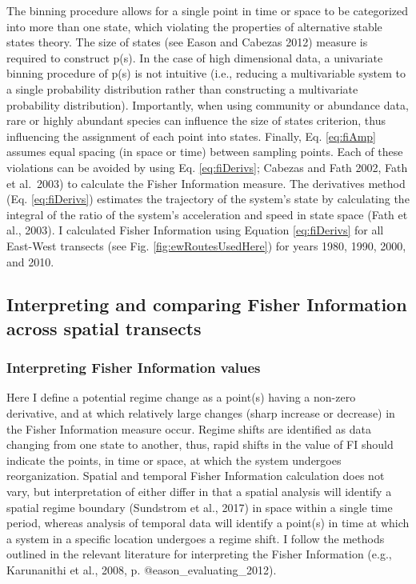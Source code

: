 \documentclass[12pt,twoside,openany]{reedthesis}
\begin{document}
The binning procedure allows for a single point in time or space to be categorized into more than one state, which violating the properties of alternative stable states theory. The size of states (see Eason and Cabezas 2012) measure is required to construct p(s). In the case of high dimensional data, a univariate binning procedure of p(s) is not intuitive (i.e., reducing a multivariable system to a single probability distribution rather than constructing a multivariate probability distribution). Importantly, when using community or abundance data, rare or highly abundant species can influence the size of states criterion, thus influencing the assignment of each point into states. Finally, Eq. \eqref{eq:fiAmp} assumes equal spacing (in space or time) between sampling points. Each of these violations can be avoided by using Eq. \eqref{eq:fiDerivs}; Cabezas and Fath 2002, Fath et al.~2003) to calculate the Fisher Information measure. The derivatives method (Eq. \eqref{eq:fiDerivs}) estimates the trajectory of the system's state by calculating the integral of the ratio of the system's acceleration and speed in state space (Fath et al., 2003). I calculated Fisher Information using Equation \eqref{eq:fiDerivs} for all East-West transects (see Fig. \ref{fig:ewRoutesUsedHere}) for years 1980, 1990, 2000, and 2010.

\hypertarget{interpreting-and-comparing-fisher-information-across-spatial-transects}{%
\subsection{Interpreting and comparing Fisher Information across spatial transects}\label{interpreting-and-comparing-fisher-information-across-spatial-transects}}

\hypertarget{interpreting-fisher-information-values}{%
\subsubsection{Interpreting Fisher Information values}\label{interpreting-fisher-information-values}}

Here I define a potential regime change as a point(s) having a non-zero derivative, and at which relatively large changes (sharp increase or decrease) in the Fisher Information measure occur. Regime shifts are identified as data changing from one state to another, thus, rapid shifts in the value of FI should indicate the points, in time or space, at which the system undergoes reorganization. Spatial and temporal Fisher Information calculation does not vary, but interpretation of either differ in that a spatial analysis will identify a spatial regime boundary (Sundstrom et al., 2017) in space within a single time period, whereas analysis of temporal data will identify a point(s) in time at which a system in a specific location undergoes a regime shift. I follow the methods outlined in the relevant literature for interpreting the Fisher Information (e.g., Karunanithi et al., 2008, p. @eason\_evaluating\_2012).
\end{document}
